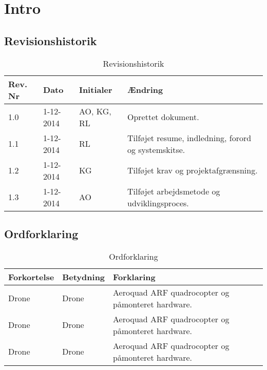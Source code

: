 \chapter{Intro}

\section{Revisionshistorik}
\begin{table}[H]
	\centering
		\begin{tabular}{|p{1.7 cm}|p{2 cm}|p{2.5 cm}|p{6.8 cm}|} 
		\hline
			\textbf{Rev. Nr} & \textbf{Dato}		& \textbf{Initialer} 	& \textbf{Ændring} \\ \hline
			1.0 	& 1-12-2014 & AO, KG, RL  & Oprettet dokument.  \\ \hline
			1.1 	& 1-12-2014 & RL  & Tilføjet resume, indledning, forord og systemskitse. \\ \hline
			1.2 	& 1-12-2014 & KG  & Tilføjet krav og projektafgrænsning. 	\\ \hline
			1.3 	& 1-12-2014 & AO  & Tilføjet arbejdsmetode og \newline udviklingsproces.	\\ \hline

		\end{tabular}
	\caption{Revisionshistorik}
\end{table}


\vspace{1.5cm}

\section{Ordforklaring}
\begin{table}[H]
	\centering
		\begin{tabular}{|p{2.6cm}|p{4.5 cm}|p{6.5 cm}|} 
		\hline
			\textbf{Forkortelse} & \textbf{Betydning} & \textbf{Forklaring} \\ \hline
			 Drone & Drone & Aeroquad ARF quadrocopter og \newline påmonteret hardware. \\ \hline
			 Drone & Drone & Aeroquad ARF quadrocopter og \newline påmonteret hardware. \\ \hline
			 Drone & Drone & Aeroquad ARF quadrocopter og \newline påmonteret hardware. \\ \hline
		\end{tabular}
	\caption{Ordforklaring}
\end{table}
